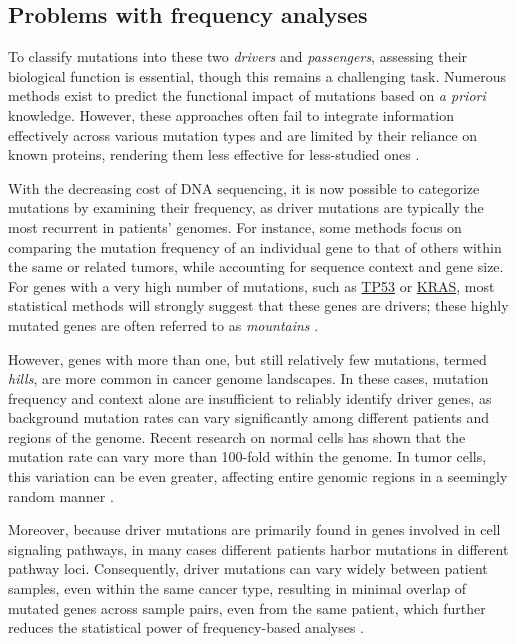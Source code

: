\subsection{Problems with frequency analyses}

To classify mutations into these two \textit{drivers} and \textit{passengers}, assessing their biological function is essential, though this remains a challenging task. Numerous methods exist to predict the functional impact of mutations based on \textit{a priori} knowledge. However, these approaches often fail to integrate information effectively across various mutation types and are limited by their reliance on known proteins, rendering them less effective for less-studied ones \cite{multi-dendrix}.

With the decreasing cost of DNA sequencing, it is now possible to categorize mutations by examining their frequency, as driver mutations are typically the most recurrent in patients' genomes. For instance, some methods focus on comparing the mutation frequency of an individual gene to that of others within the same or related tumors, while accounting for sequence context and gene size. For genes with a very high number of mutations, such as \href{https://en.wikipedia.org/wiki/P53}{TP53} or \href{https://en.wikipedia.org/wiki/KRAS}{KRAS}, most statistical methods will strongly suggest that these genes are drivers; these highly mutated genes are often referred to as \textit{mountains} \cite{multi-dendrix, vogelstein2013}.

However, genes with more than one, but still relatively few mutations, termed \textit{hills}, are more common in cancer genome landscapes. In these cases, mutation frequency and context alone are insufficient to reliably identify driver genes, as background mutation rates can vary significantly among different patients and regions of the genome. Recent research on normal cells has shown that the mutation rate can vary more than 100-fold within the genome. In tumor cells, this variation can be even greater, affecting entire genomic regions in a seemingly random manner \cite{vogelstein2013}.

Moreover, because driver mutations are primarily found in genes involved in cell signaling pathways, in many cases different patients harbor mutations in different pathway loci. Consequently, driver mutations can vary widely between patient samples, even within the same cancer type, resulting in minimal overlap of mutated genes across sample pairs, even from the same patient, which further reduces the statistical power of frequency-based analyses \cite{multi-dendrix, mdpfinder}.

